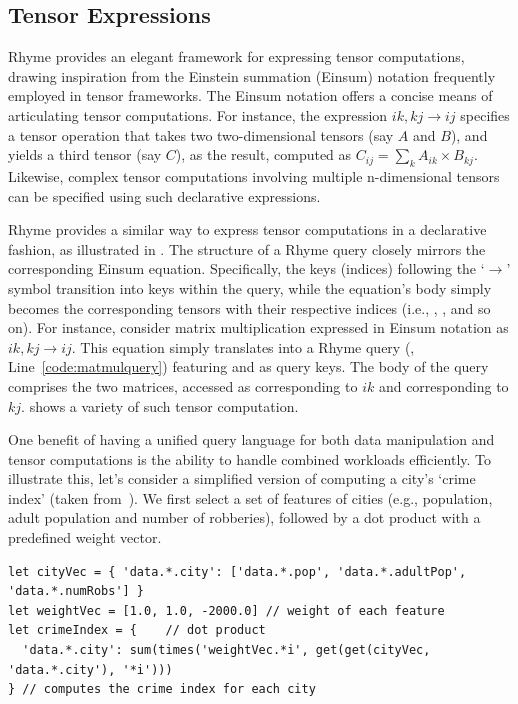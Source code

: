 \documentclass[runningheads]{llncs}
\newcommand{\lang}{Rhyme}
\begin{document}
\subsection{Tensor Expressions}\label{subsec:tensor}

\lang{} provides an elegant framework for expressing tensor computations,
drawing inspiration from the Einstein summation (Einsum) notation frequently
employed in tensor frameworks.
The Einsum notation offers a concise means of articulating tensor computations.
For instance, the expression $ik,kj \rightarrow ij$ specifies a tensor operation
that takes two two-dimensional tensors (say $A$ and $B$), and yields a third
tensor (say $C$), as the result, computed as $C_{ij} = \sum_k A_{ik} \times B_{kj}$.
Likewise, complex tensor computations involving multiple n-dimensional tensors can
be specified using such declarative expressions.

\lang{} provides a similar way to express tensor computations in a declarative fashion,
as illustrated in .
The structure of a \lang{} query closely mirrors the corresponding Einsum equation.
Specifically, the keys (indices) following the `$\rightarrow$' symbol transition into keys
within the query, while the equation's body simply becomes the corresponding tensors
with their respective indices (i.e., , , and so on).
For instance, consider matrix multiplication expressed in Einsum notation as
$ik,kj \rightarrow ij$.
This equation simply translates into a \lang{} query (, Line~\ref{code:matmulquery}) featuring  and
 as query keys. The body of the query comprises the two matrices, accessed as
 corresponding to $ik$ and  corresponding to $kj$.
 shows a variety of such tensor computation.

One benefit of having a unified query language for both data manipulation and tensor
computations is the ability to handle combined workloads efficiently.
To illustrate this, let's consider a simplified version of computing a city's
`crime index' (taken from~\cite{weld}).
We first select a set of features of cities (e.g., population, 
adult population and number of robberies), followed by a dot product
with a predefined weight vector.

\begin{lstlisting}[style=JavaScript,columns=flexible]
let cityVec = { 'data.*.city': ['data.*.pop', 'data.*.adultPop', 'data.*.numRobs'] }
let weightVec = [1.0, 1.0, -2000.0] // weight of each feature
let crimeIndex = {    // dot product
  'data.*.city': sum(times('weightVec.*i', get(get(cityVec, 'data.*.city'), '*i')))
} // computes the crime index for each city
\end{lstlisting}
\end{document}
